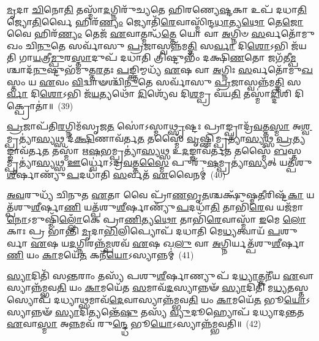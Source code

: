 \-\ul{𑌮𑍃}\-𑌦𑌾 \ul{𑌚𑌿}\-𑌨𑍋\-\ul{𑌤𑌿} 𑌤𑌸𑍍𑌮𑌾᳴\-\ul{𑌦}\-𑌗𑍍𑌨𑌿𑌰𑍁᳴𑌚𑍍𑌯𑌤𑍇 𑌹𑌿𑌰𑌣𑍍𑌯𑍇\-\ul{𑌷𑍍𑌟}\-𑌕𑌾 𑌉𑌪᳴ 𑌦𑌧𑌾\-\ul{𑌤𑌿} 𑌜𑍍𑌯𑍋\-\ul{𑌤𑌿}\-𑌰𑍍𑌵𑍈 𑌹𑌿𑌰᳴\-\ul{𑌣𑍍𑌯𑌂} 𑌜𑍍𑌯𑍋𑌤𑌿᳴\-\ul{𑌰𑍇}\-𑌵𑌾𑌸𑍍𑌮𑌿᳴𑌨𑍍𑌦\-\ul{𑌧𑌾}\-𑌤𑍍𑌯\-\ul{𑌥𑍋} 𑌤𑍇\-\ul{𑌜𑍋} 𑌵𑍈 𑌹𑌿𑌰᳴\-\ul{𑌣𑍍𑌯𑌂} 𑌤𑍇𑌜᳴ \ul{𑌏}\-𑌵𑌾𑌤𑍍𑌮𑌨𑍍𑌧᳴\-\ul{𑌤𑍍𑌤𑍇} 𑌯𑍋 𑌵𑌾 \ul{𑌅}\-𑌗𑍍𑌨𑌿𑍞 \ul{𑌸}\-𑌰𑍍𑌵𑌤𑍋᳴𑌮𑍁𑌖𑌂 𑌚𑌿\-\ul{𑌨𑍁}\-𑌤𑍇 𑌸𑌰𑍍𑌵𑌾᳴𑌸𑍁 \ul{𑌪𑍍𑌰}\-𑌜𑌾𑌸𑍍𑌵𑌨𑍍𑌨᳴𑌮\-\ul{𑌤𑍍𑌤𑌿} 𑌸\-\ul{𑌰𑍍𑌵𑌾} 𑌦𑌿\-\ul{𑌶𑍋}\-\-𑌽𑌭𑌿 𑌜᳴𑌯𑌤𑌿 𑌗𑌾\-\ul{𑌯}\-𑌤𑍍𑌰𑍀\-\ul{𑌮𑍍𑌪𑍁}\-𑌰\-\ul{𑌸𑍍𑌤𑌾}\-𑌦𑍁𑌪᳴ 𑌦𑌧𑌾𑌤𑌿 𑌤𑍍𑌰𑌿𑌷𑍍𑌟𑍁𑌭𑌂᳴ 𑌦𑌕𑍍𑌷𑌿\-\ul{𑌣}\-𑌤𑍋 𑌜𑌗᳴𑌤𑍀\-\ul{𑌮𑍍𑌪}\-𑌶𑍍𑌚𑌾𑌦᳴\-\ul{𑌨𑍁}\-𑌷𑍍𑌟𑍁𑌭᳴𑌮𑍁𑌤𑍍𑌤\-\ul{𑌰}\-𑌤𑌃 \ul{𑌪}\-𑌙𑍍𑌕𑍍𑌤𑌿𑌮𑍍𑌮𑌧𑍍𑌯᳴ \ul{𑌏}\-𑌷 𑌵𑌾 \ul{𑌅}\-𑌗𑍍𑌨𑌿𑌃 \ul{𑌸}\-𑌰𑍍𑌵𑌤𑍋᳴𑌮𑍁\-\ul{𑌖}\-𑌸𑍍𑌤𑌂 𑌯 \ul{𑌏}\-𑌵𑌂 \ul{𑌵𑌿}\-𑌦𑍍𑌵𑌾𑍟𑌶𑍍𑌚𑌿᳴\-\ul{𑌨𑍁}\-𑌤𑍇 𑌸𑌰𑍍𑌵𑌾᳴𑌸𑍁 \ul{𑌪𑍍𑌰}\-𑌜𑌾𑌸𑍍𑌵𑌨𑍍𑌨᳴𑌮\-\ul{𑌤𑍍𑌤𑌿} 𑌸\-\ul{𑌰𑍍𑌵𑌾} 𑌦𑌿\-\ul{𑌶𑍋}\-\-𑌽𑌭𑌿 𑌜᳴\-\ul{𑌯}\-𑌤𑍍𑌯𑌥𑍋᳴ \ul{𑌦𑌿}\-𑌶𑍍𑌯𑍇᳴𑌵 𑌦𑌿\-\ul{𑌶}\-𑌮𑍍𑌪𑍍𑌰 𑌵᳴𑌯\-\ul{𑌤𑌿} 𑌤𑌸𑍍𑌮𑌾॑\-\ul{𑌦𑍍𑌦𑌿}\-𑌶𑌿 𑌦𑌿𑌕𑍍𑌪𑍍𑌰𑍋𑌤𑌾॑॥~(39)

{\anuvakamend[{𑌅𑌪𑌿᳴ \ul{𑌸𑌂} 𑌯𑍗𑌤𑌿᳴ 𑌵𑍈𑌶𑍍𑌵𑌾\-\ul{𑌨}\-𑌰𑍋 𑌯\-\ul{𑌦𑍇}\-𑌷 𑌵𑍈 𑌪𑌞𑍍𑌚᳴𑌵𑌿𑍞𑌶𑌤𑌿𑌶𑍍𑌚}]}%

\-\ul{𑌪𑍍𑌰}\-𑌜𑌾𑌪᳴𑌤𑌿\-\ul{𑌰}\-𑌗𑍍𑌨𑌿𑌮᳴𑌸𑍃𑌜\-\ul{𑌤} 𑌸𑍋॑\-𑌽𑌸𑍍𑌮𑌾\-\ul{𑌥𑍍𑌸𑍃}\-𑌷𑍍𑌟𑌃 𑌪𑍍𑌰𑌾𑌙𑍍𑌪𑍍𑌰𑌾𑌦𑍍𑌰᳴\-\ul{𑌵}\-𑌤𑍍𑌤\-\ul{𑌸𑍍𑌮𑌾} 𑌅\-\ul{𑌶𑍍𑌵}\-𑌮𑍍𑌪𑍍𑌰𑌤𑍍𑌯𑌾॑\-\ul{𑌸𑍍𑌯}\-𑌥𑍍𑌸 𑌦᳴\-\ul{𑌕𑍍𑌷𑌿}\-𑌣𑌾𑌵᳴𑌰𑍍𑌤\-\ul{𑌤} 𑌤𑌸𑍍𑌮𑍈᳴ \ul{𑌵𑍃}\-𑌷𑍍𑌣𑌿𑌮𑍍𑌪𑍍𑌰𑌤𑍍𑌯𑌾॑\-\ul{𑌸𑍍𑌯}\-𑌥𑍍𑌸 \ul{𑌪𑍍𑌰}\-𑌤𑍍𑌯𑌙𑍍𑌙𑌾𑌵᳴𑌰𑍍𑌤\-\ul{𑌤} 𑌤𑌸𑍍𑌮𑌾᳴ 𑌋\-\ul{𑌷}\-𑌭𑌮𑍍𑌪𑍍𑌰𑌤𑍍𑌯𑌾॑\-\ul{𑌸𑍍𑌯}\-𑌥𑍍𑌸 𑌉\-\ul{𑌦}\-𑌙𑍍𑌙𑌾𑌵᳴𑌰𑍍𑌤\-\ul{𑌤} 𑌤𑌸𑍍𑌮𑍈᳴ \ul{𑌬}\-𑌸𑍍𑌤𑌮𑍍𑌪𑍍𑌰𑌤𑍍𑌯𑌾॑\-\ul{𑌸𑍍𑌯}\-𑌥𑍍𑌸 \ul{𑌊}\-𑌰𑍍𑌧𑍍𑌵𑍋॑\-𑌽𑌦𑍍𑌰\-\ul{𑌵}\-𑌤𑍍𑌤\-\ul{𑌸𑍍𑌮𑍈} 𑌪𑍁𑌰𑍁᳴\-\ul{𑌷}\-𑌮𑍍𑌪𑍍𑌰𑌤𑍍𑌯𑌾॑\-\ul{𑌸𑍍𑌯}\-𑌤𑍍 𑌯𑌤𑍍𑌪᳴𑌶𑍁\-\ul{𑌶𑍀}\-𑌰𑍍\mbox{}𑌷𑌾𑌣𑍍𑌯𑍁᳴\-\ul{𑌪}\-𑌦𑌧𑌾᳴𑌤𑌿 \ul{𑌸}\-𑌰𑍍𑌵𑌤᳴ \ul{𑌏}\-𑌵𑍈𑌨𑌮𑍍॑~(40)

\-\ul{𑌅}\-\-\ul{𑌵}\-𑌰𑍁𑌧𑍍𑌯᳴ 𑌚𑌿𑌨𑍁𑌤 \ul{𑌏}\-𑌤𑌾 𑌵𑍈 𑌪𑍍𑌰𑌾᳴\-\ul{𑌣}\-𑌭𑍃\-\ul{𑌤}\-𑌶𑍍𑌚𑌕𑍍𑌷𑍁᳴𑌷𑍍𑌮\-\ul{𑌤𑍀}\-𑌰𑌿𑌷𑍍𑌟᳴\-\ul{𑌕𑌾} 𑌯𑌤𑍍𑌪᳴𑌶𑍁\-\ul{𑌶𑍀}\-𑌰𑍍\mbox{}𑌷𑌾\-\ul{𑌣𑌿} 𑌯𑌤𑍍𑌪᳴𑌶𑍁\-\ul{𑌶𑍀}\-𑌰𑍍\mbox{}𑌷𑌾𑌣𑍍𑌯𑍁᳴\-\ul{𑌪}\-𑌦𑌧𑌾᳴\-\ul{𑌤𑌿} 𑌤𑌾𑌭𑌿᳴\-\ul{𑌰𑍇}\-𑌵 𑌯𑌜᳴𑌮𑌾\-\ul{𑌨𑍋}\-\-𑌽𑌮𑍁𑌷𑍍𑌮𑌿᳴\-\ul{𑌲𑍍𑌲𑍋𑌁}\-𑌕𑍇 𑌪𑍍𑌰𑌾\-\ul{𑌣𑌿}\-𑌤𑍍𑌯\-\ul{𑌥𑍋} 𑌤𑌾𑌭𑌿᳴\-\ul{𑌰𑍇}\-𑌵𑌾𑌸𑍍𑌮𑌾᳴ \ul{𑌇}\-𑌮𑍇 \ul{𑌲𑍋}\-𑌕𑌾𑌃 𑌪𑍍𑌰 𑌭𑌾॑𑌨𑍍𑌤𑌿 \ul{𑌮𑍃}\-𑌦𑌾\-\ul{𑌭𑌿}\-𑌲𑌿𑌪𑍍𑌯𑍋𑌪᳴ 𑌦𑌧𑌾𑌤𑌿 𑌮𑍇\-\ul{𑌧𑍍𑌯}\-𑌤𑍍𑌵𑌾𑌯᳴ \ul{𑌪}\-𑌶𑍁𑌰𑍍𑌵𑌾 \ul{𑌏}\-𑌷 𑌯\-\ul{𑌦}\-𑌗𑍍𑌨𑌿𑌰𑌨𑍍𑌨᳴\-\ul{𑌮𑍍𑌪}\-𑌶𑌵᳴ \ul{𑌏}\-𑌷 𑌖\-\ul{𑌲𑍁} 𑌵𑌾 \ul{𑌅}\-𑌗𑍍𑌨𑌿𑌰𑍍𑌯𑌤𑍍𑌪᳴𑌶𑍁\-\ul{𑌶𑍀}\-𑌰𑍍\mbox{}𑌷𑌾\-\ul{𑌣𑌿} 𑌯𑌂 \ul{𑌕𑌾}\-𑌮𑌯𑍇᳴\-\ul{𑌤} 𑌕𑌨𑍀᳴\-\ul{𑌯𑍋}\-\-𑌽𑌸𑍍𑌯𑌾𑌨𑍍𑌨𑌮𑍍॑~(41)

\-\ul{𑌸𑍍𑌯𑌾}\-𑌦𑌿𑌤𑌿᳴ 𑌸\-\ul{𑌨𑍍𑌤}\-𑌰𑌾𑌂 𑌤𑌸𑍍𑌯᳴ 𑌪𑌶𑍁\-\ul{𑌶𑍀}\-𑌰𑍍\mbox{}𑌷𑌾𑌣𑍍𑌯𑍁𑌪᳴ 𑌦\-\ul{𑌧𑍍𑌯𑌾}\-𑌤𑍍𑌕𑌨𑍀᳴𑌯 \ul{𑌏}\-𑌵𑌾𑌸𑍍𑌯𑌾𑌨𑍍𑌨᳴𑌮𑍍𑌭𑌵\-\ul{𑌤𑌿} 𑌯𑌂 \ul{𑌕𑌾}\-𑌮𑌯𑍇᳴𑌤 \ul{𑌸}\-𑌮𑌾𑌵᳴\-\ul{𑌦}\-𑌸𑍍𑌯𑌾𑌨𑍍𑌨𑍟᳴ \ul{𑌸𑍍𑌯𑌾}\-𑌦𑌿𑌤𑌿᳴ 𑌮\-\ul{𑌧𑍍𑌯}\-𑌤𑌸𑍍𑌤𑌸𑍍𑌯𑍋𑌪᳴ 𑌦𑌧𑍍𑌯𑌾\-\ul{𑌥𑍍𑌸}\-𑌮𑌾𑌵᳴\-\ul{𑌦𑍇}\-𑌵𑌾𑌸𑍍𑌯𑌾𑌨𑍍𑌨᳴𑌮𑍍𑌭𑌵\-\ul{𑌤𑌿} 𑌯𑌂 \ul{𑌕𑌾}\-𑌮𑌯𑍇᳴\-\ul{𑌤} 𑌭𑍂\-\ul{𑌯𑍋}\-\-𑌽𑌸𑍍𑌯𑌾𑌨𑍍𑌨𑍟᳴ \ul{𑌸𑍍𑌯𑌾}\-𑌦𑌿𑌤𑍍𑌯𑌨𑍍𑌤𑍇᳴\-\ul{𑌷𑍁} 𑌤𑌸𑍍𑌯᳴ \ul{𑌵𑍍𑌯𑍁}\-𑌦𑍂𑌹𑍍𑌯𑍋𑌪᳴ 𑌦𑌧𑍍𑌯𑌾𑌦\-\ul{𑌨𑍍𑌤}\-𑌤 \ul{𑌏}\-𑌵𑌾\-\ul{𑌸𑍍𑌮𑌾} 𑌅\-\ul{𑌨𑍍𑌨}\-𑌮𑌵᳴ 𑌰𑍁\-\ul{𑌨𑍍𑌦𑍍𑌧𑍇} 𑌭𑍂\-\ul{𑌯𑍋}\-\-𑌽𑌸𑍍𑌯𑌾𑌨𑍍𑌨᳴𑌮𑍍𑌭𑌵𑌤𑌿॥~(42)


